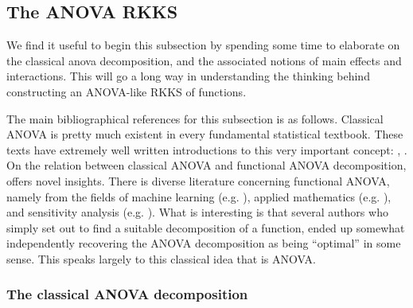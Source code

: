 \subsection{The ANOVA RKKS}

We find it useful to begin this subsection by spending some time to elaborate on the classical \gls{anova} decomposition, and the associated notions of main effects and interactions.
This will go a long way in understanding the thinking behind constructing an ANOVA-like RKKS of functions.

The main bibliographical references for this subsection is as follows.
Classical ANOVA is pretty much existent in every fundamental statistical textbook. 
These texts have extremely well written introductions to this very important concept: \citet[Ch. 11]{casella2002statistical}, \citet[Ch. 3]{dean1999design}.
On the relation between classical ANOVA and functional ANOVA decomposition, \citet{gu2013smoothing} offers novel insights.
There is diverse literature concerning functional ANOVA, namely from the fields of machine learning (e.g. \cite{durrande2013anova}), applied mathematics (e.g. \cite{kuo2010decompositions}), and sensitivity analysis (e.g. \cite{sobol2001global}).
What is interesting is that several authors who simply set out to find a suitable decomposition of a function, ended up somewhat independently recovering the ANOVA decomposition as being ``optimal'' in some sense.
This speaks largely to this classical idea that is ANOVA.

\subsubsection{The classical ANOVA decomposition}

